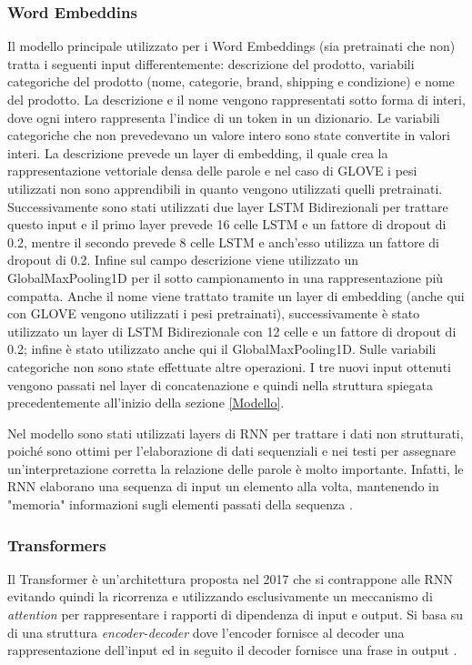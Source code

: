 \subsubsection{Word Embeddins}
Il modello principale utilizzato per i Word Embeddings (sia pretrainati che non) tratta i seguenti input differentemente: descrizione del prodotto, variabili categoriche del prodotto (nome, categorie, brand, shipping e condizione) e nome del prodotto.
La descrizione e il nome vengono rappresentati sotto forma di interi, dove ogni intero rappresenta l'indice di un token in un dizionario.
Le variabili categoriche che non prevedevano un valore intero sono state convertite in valori interi.
La descrizione prevede un layer di embedding, il quale crea la rappresentazione vettoriale densa delle parole e nel caso di GLOVE i pesi utilizzati non sono apprendibili in quanto vengono utilizzati quelli pretrainati.
Successivamente sono stati utilizzati due layer LSTM Bidirezionali per trattare questo input e il primo layer prevede 16 celle LSTM e un fattore di dropout di 0.2, mentre il secondo prevede 8 celle LSTM e anch'esso utilizza un fattore di dropout di 0.2.
Infine sul campo descrizione viene utilizzato un GlobalMaxPooling1D per il sotto campionamento in una rappresentazione più compatta.
Anche il nome viene trattato tramite un layer di embedding (anche qui con GLOVE vengono utilizzati i pesi pretrainati), successivamente è stato utilizzato un layer di LSTM Bidirezionale con 12 celle e un fattore di dropout di 0.2; infine è stato utilizzato anche qui il GlobalMaxPooling1D.
Sulle variabili categoriche non sono state effettuate altre operazioni.
I tre nuovi input ottenuti vengono passati nel layer di concatenazione e quindi nella struttura spiegata precedentemente all'inizio della sezione \ref{Modello}.

Nel modello sono stati utilizzati layers di RNN per trattare i dati non
strutturati, poiché sono ottimi per l'elaborazione di dati sequenziali e nei
testi per assegnare un'interpretazione corretta la relazione delle parole è
molto importante. Infatti, le RNN elaborano una sequenza di input un elemento
alla volta, mantenendo in "memoria" informazioni sugli elementi passati della
sequenza \cite{liang2017text}.

\subsubsection{Transformers}
Il Transformer è un'architettura proposta nel 2017 che si contrappone alle RNN
evitando quindi la ricorrenza e utilizzando esclusivamente un meccanismo di
\textit{attention} per rappresentare i rapporti di dipendenza di input e output.
Si basa su di una struttura \textit{encoder-decoder} dove l'encoder fornisce al
decoder una rappresentazione dell'input ed in seguito il decoder fornisce una
frase in output \cite{vaswani2017attention}.

